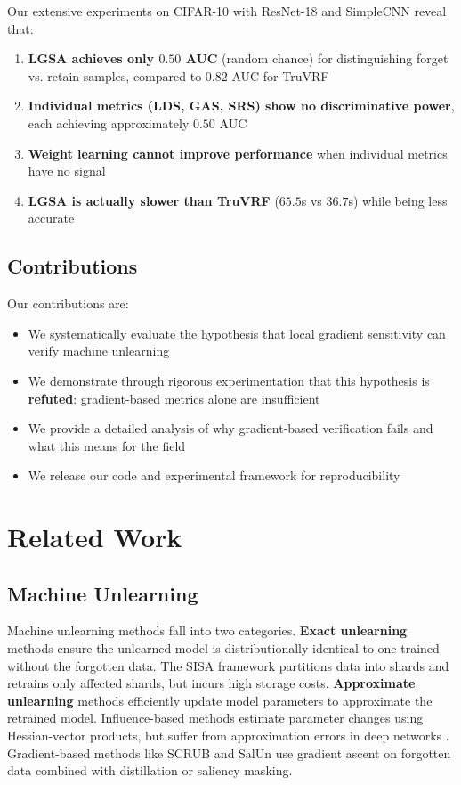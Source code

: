 \documentclass{article}
\begin{document}
Our extensive experiments on CIFAR-10 with ResNet-18 and SimpleCNN reveal that:
\begin{enumerate}
    \item \textbf{LGSA achieves only $0.50$ AUC} (random chance) for distinguishing forget vs. retain samples, compared to $0.82$ AUC for TruVRF \cite{zhou2024truvrf}
    \item \textbf{Individual metrics (LDS, GAS, SRS) show no discriminative power}, each achieving approximately $0.50$ AUC
    \item \textbf{Weight learning cannot improve performance} when individual metrics have no signal
    \item \textbf{LGSA is actually slower than TruVRF} ($65.5$s vs $36.7$s) while being less accurate
\end{enumerate}

\subsection{Contributions}

Our contributions are:
\begin{itemize}
    \item We systematically evaluate the hypothesis that local gradient sensitivity can verify machine unlearning
    \item We demonstrate through rigorous experimentation that this hypothesis is \textbf{refuted}: gradient-based metrics alone are insufficient
    \item We provide a detailed analysis of why gradient-based verification fails and what this means for the field
    \item We release our code and experimental framework for reproducibility
\end{itemize}

\section{Related Work}
\label{sec:related}

\subsection{Machine Unlearning}

Machine unlearning methods fall into two categories. \textbf{Exact unlearning} methods ensure the unlearned model is distributionally identical to one trained without the forgotten data. The SISA framework \cite{bourtoule2021machine} partitions data into shards and retrains only affected shards, but incurs high storage costs. \textbf{Approximate unlearning} methods efficiently update model parameters to approximate the retrained model. Influence-based methods \citep{guo2020fastif, izzo2021approximate} estimate parameter changes using Hessian-vector products, but suffer from approximation errors in deep networks \cite{basu2021influence}. Gradient-based methods like SCRUB \cite{kurmanji2023towards} and SalUn \cite{fan2024salun} use gradient ascent on forgotten data combined with distillation or saliency masking.
\end{document}
